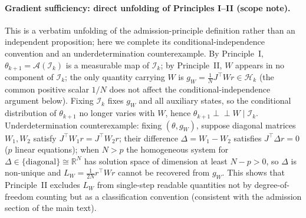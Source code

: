 \documentclass[11pt]{article}
\newcommand{\R}{\mathbb R}
\newcommand{\W}{W}
\numberwithin{equation}{section}
\begin{document}
\paragraph{Gradient sufficiency: direct unfolding of Principles I--II (scope note).}
This is a verbatim unfolding of the admission-principle definition rather than an independent proposition; here we complete its conditional-independence convention and an underdetermination counterexample. By Principle~I, $\theta_{k+1}=\mathcal A(\mathcal I_k)$ is a measurable map of $\mathcal I_k$; by Principle~II, $\W$ appears in no component of $\mathcal I_k$; the only quantity carrying $\W$ is $g_{\W}=\tfrac1N J^\top\W r\in\mathcal H_k$ (the common positive scalar $1/N$ does not affect the conditional-independence argument below). Fixing $\mathcal I_k$ fixes $g_{\W}$ and all auxiliary states, so the conditional distribution of $\theta_{k+1}$ no longer varies with $\W$, hence $\theta_{k+1}\perp\!\!\!\perp\W\mid\mathcal I_k$. Underdetermination counterexample: fixing $(\theta,g_{\W})$, suppose diagonal matrices $\W_1,\W_2$ satisfy $J^\top\W_1r=J^\top\W_2r$; their difference $\Delta=\W_1-\W_2$ satisfies $J^\top\Delta r=0$ ($p$ linear equations); when $N>p$ the homogeneous system for $\Delta\in\{\text{diagonal}\}\cong\R^N$ has solution space of dimension at least $N-p>0$, so $\Delta$ is non-unique and $L_{\W}=\tfrac1{2N}r^\top\W r$ cannot be recovered from $g_{\W}$. This shows that Principle~II excludes $L_{\W}$ from single-step readable quantities not by degree-of-freedom counting but as a classification convention (consistent with the admission section of the main text).
\end{document}
